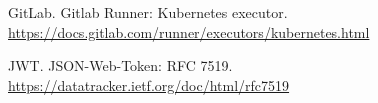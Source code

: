 \documentclass[letterpaper, 10 pt, conference]{ieeeconf}
\begin{document}
\begin{thebibliography}{99}

 GitLab.  Gitlab Runner: Kubernetes executor.   \url{https://docs.gitlab.com/runner/executors/kubernetes.html}

 JWT.  JSON-Web-Token: RFC 7519.   \url{https://datatracker.ietf.org/doc/html/rfc7519}

\end{thebibliography}


\addtolength{\textheight}{-12cm}
\end{document}
